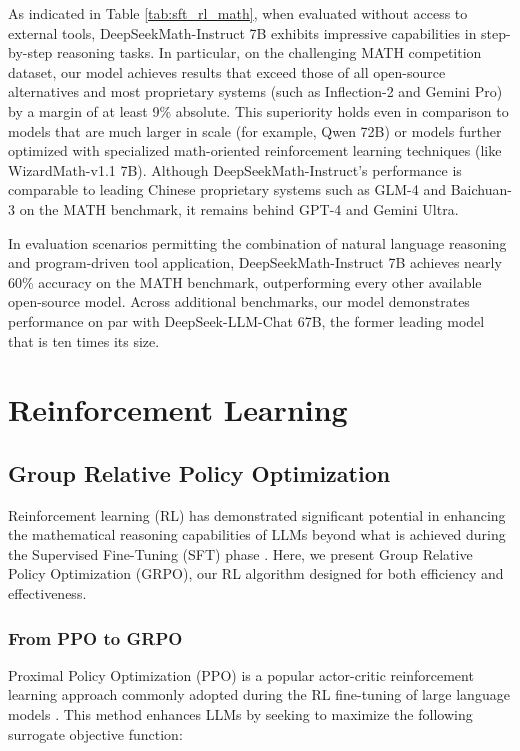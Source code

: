\begin{itemize}[topsep=0pt]
\begin{itemize}[topsep=0pt]
As indicated in Table \ref{tab:sft_rl_math}, when evaluated without access to external tools, DeepSeekMath-Instruct 7B exhibits impressive capabilities in step-by-step reasoning tasks. In particular, on the challenging MATH competition dataset, our model achieves results that exceed those of all open-source alternatives and most proprietary systems (such as Inflection-2 and Gemini Pro) by a margin of at least 9\% absolute. This superiority holds even in comparison to models that are much larger in scale (for example, Qwen 72B) or models further optimized with specialized math-oriented reinforcement learning techniques (like WizardMath-v1.1 7B). Although DeepSeekMath-Instruct's performance is comparable to leading Chinese proprietary systems such as GLM-4 and Baichuan-3 on the MATH benchmark, it remains behind GPT-4 and Gemini Ultra.

In evaluation scenarios permitting the combination of natural language reasoning and program-driven tool application, DeepSeekMath-Instruct 7B achieves nearly 60\% accuracy on the MATH benchmark, outperforming every other available open-source model. Across additional benchmarks, our model demonstrates performance on par with DeepSeek-LLM-Chat 67B, the former leading model that is ten times its size.
\section{Reinforcement Learning}

\subsection{Group Relative Policy Optimization} Reinforcement learning (RL) has demonstrated significant potential in enhancing the mathematical reasoning capabilities of LLMs beyond what is achieved during the Supervised Fine-Tuning (SFT) phase \citep{wang2023math,wizardmath}. Here, we present Group Relative Policy Optimization (GRPO), our RL algorithm designed for both efficiency and effectiveness.

\subsubsection{From PPO to GRPO} Proximal Policy Optimization (PPO) \citep{schulman2017proximal} is a popular actor-critic reinforcement learning approach commonly adopted during the RL fine-tuning of large language models \citep{ouyang2022training}. This method enhances LLMs by seeking to maximize the following surrogate objective function:


\end{itemize}
\end{itemize}
